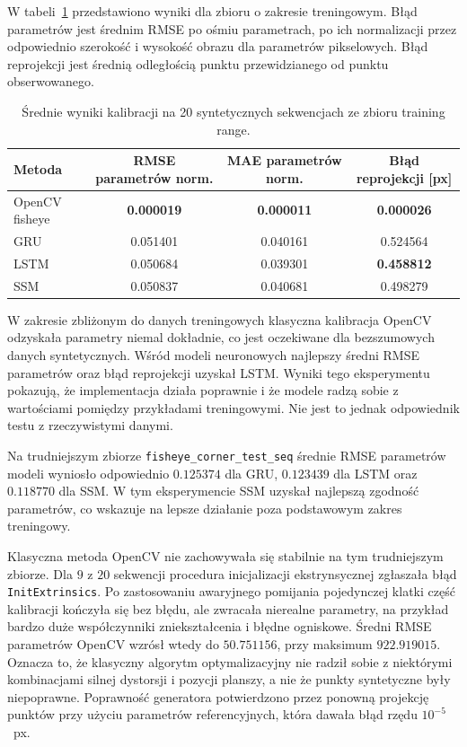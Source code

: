 W tabeli~\ref{tab:wyniki-syntetyczne-training-range} przedstawiono wyniki dla
zbioru o zakresie treningowym. Błąd parametrów jest średnim RMSE po ośmiu
parametrach, po ich normalizacji przez odpowiednio szerokość i wysokość
obrazu dla parametrów pikselowych. Błąd reprojekcji jest średnią odległością
punktu przewidzianego od punktu obserwowanego.

\begin{table}[htbp]
  \centering
  \small
  \begin{tabular}{@{}lccc@{}}
    \toprule
    \textbf{Metoda} & \textbf{RMSE parametrów norm.} & \textbf{MAE parametrów norm.} & \textbf{Błąd reprojekcji [px]} \\
    \midrule
    OpenCV fisheye & \textbf{0.000019} & \textbf{0.000011} & \textbf{0.000026} \\
    GRU            & 0.051401         & 0.040161         & 0.524564 \\
    LSTM           & 0.050684         & 0.039301         & \textbf{0.458812} \\
    SSM            & 0.050837         & 0.040681         & 0.498279 \\
    \bottomrule
  \end{tabular}
  \caption{Średnie wyniki kalibracji na 20 syntetycznych sekwencjach ze zbioru training range.}
  \label{tab:wyniki-syntetyczne-training-range}
\end{table}

W zakresie zbliżonym do danych treningowych klasyczna kalibracja OpenCV
odzyskała parametry niemal dokładnie, co jest oczekiwane dla bezszumowych
danych syntetycznych. Wśród modeli neuronowych najlepszy średni RMSE parametrów oraz błąd reprojekcji uzyskał LSTM. Wyniki tego eksperymentu pokazują, że implementacja działa poprawnie i że modele radzą sobie z wartościami pomiędzy przykładami treningowymi. Nie jest to jednak odpowiednik testu z rzeczywistymi danymi.

Na trudniejszym zbiorze \texttt{fisheye\_corner\_test\_seq} średnie RMSE
parametrów modeli wyniosło odpowiednio $0.125374$ dla GRU, $0.123439$ dla
LSTM oraz $0.118770$ dla SSM. W tym eksperymencie SSM uzyskał najlepszą
zgodność parametrów, co wskazuje na lepsze działanie poza podstawowym
zakres treningowy.

Klasyczna metoda OpenCV nie zachowywała się stabilnie na tym trudniejszym
zbiorze. Dla $9$ z $20$ sekwencji procedura inicjalizacji ekstrynsycznej
zgłaszała błąd \texttt{InitExtrinsics}. Po zastosowaniu awaryjnego pomijania
pojedynczej klatki część kalibracji kończyła się bez błędu, ale
zwracała nierealne parametry, na przykład bardzo duże współczynniki
zniekształcenia i błędne ogniskowe. Średni RMSE parametrów OpenCV wzrósł
wtedy do $50.751156$, przy maksimum $922.919015$. Oznacza to, że klasyczny
algorytm optymalizacyjny nie radził sobie z niektórymi kombinacjami silnej dystorsji i pozycji
planszy, a nie że punkty syntetyczne były niepoprawne. Poprawność generatora
potwierdzono przez ponowną projekcję punktów przy użyciu parametrów
referencyjnych, która dawała błąd rzędu $10^{-5}$~px.

